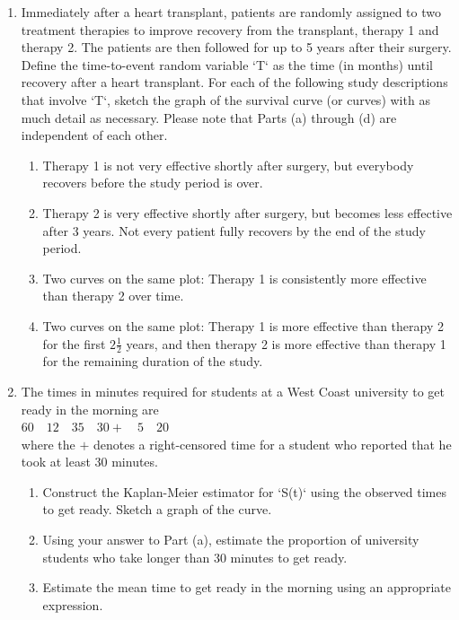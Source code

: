 \documentclass[
]{report}
\begin{document}
\begin{enumerate}
  \item Immediately after a heart transplant, patients are randomly assigned to two treatment therapies to improve recovery from the transplant, therapy 1 and therapy 2. The patients are then followed for up to 5 years after their surgery. Define the time-to-event random variable `T` as the time (in months) until recovery after a heart transplant. For each of the following study descriptions that involve `T`, sketch the graph of the survival curve (or curves) with as much detail as necessary. Please note that Parts (a) through (d) are independent of each other.
  \begin{enumerate}
    \item Therapy 1 is not very effective shortly after surgery, but everybody recovers before the study period is over.
    \item Therapy 2 is very effective shortly after surgery, but becomes less effective after 3 years. Not every patient fully recovers by the end of the study period.
    \item Two curves on the same plot: Therapy 1 is consistently more effective than therapy 2 over time.
    \item Two curves on the same plot: Therapy 1 is more effective than therapy 2 for the first $\scriptstyle 2\frac{1}{2}$ years, and then therapy 2 is more effective than therapy 1 for the remaining duration of the study.
  \end{enumerate}

  \item The times in minutes required for students at a West Coast university to get ready in the morning are\\
  \hspace*{1em} $\scriptstyle 60 \quad 12 \quad 35 \quad 30+ \quad 5 \quad 20$\\
  where the $\scriptstyle +$ denotes a right-censored time for a student who reported that he took at least 30 minutes.
  \begin{enumerate}
    \item Construct the Kaplan-Meier estimator for `S(t)` using the observed times to get ready. Sketch a graph of the curve.
    \item Using your answer to Part (a), estimate the proportion of university students who take longer than 30 minutes to get ready.
    \item Estimate the mean time to get ready in the morning using an appropriate expression.
  \end{enumerate}


\end{enumerate}
\end{document}
